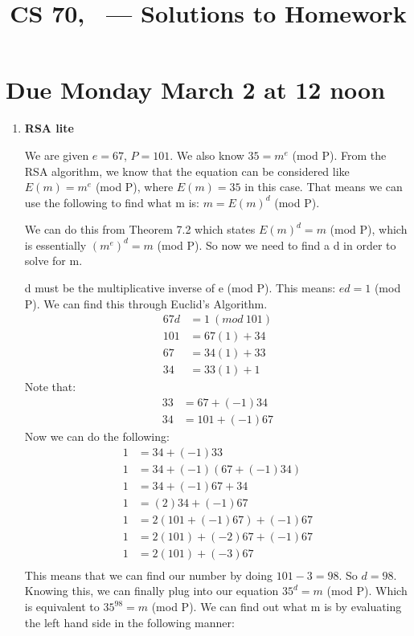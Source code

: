 \documentclass[12pt,fleqn]{article}
\title{CS 70, \Session\ --- Solutions to Homework \Homework}
\date{}
\begin{document}
\maketitle

\section*{Due Monday March 2 at 12 noon}



\begin{enumerate}
  
  \item \textbf{RSA lite} 
  
  We are given $e = 67$, $P = 101$. We also know $35 = m^{e}$ (mod P). 
  From the RSA algorithm, we know that the equation can be considered like $E(m) = m^{e}$ (mod P), where $E(m) = 35$ in this case. That means we can use the following to find what m is: $m = E(m)^{d}$ (mod P). 
  
  We can do this from Theorem 7.2 which states $E(m)^{d} = m$ (mod P), which is essentially $(m^{e})^{d} = m$ (mod P). So now we need to find a d in order to solve for m. 
  
  d must be the multiplicative inverse of e (mod P). This means: $ed = 1$ (mod P). We can find this through Euclid's Algorithm. 
  \begin{align*} 
	67d &= 1 \:(mod\: 101) \\
	101 &= 67(1) + 34 \\
	67 &= 34(1) + 33 \\
	34 &= 33(1) + 1 
  \end{align*}
  Note that: 
  \begin{align*} 
	33 &= 67 + (-1)34 \\
	34 &= 101 + (-1)67 
  \end{align*} 
  Now we can do the following:
  \begin{align*} 
	1 &= 34 + (-1)33 \\
	1 &= 34 + (-1)(67 + (-1)34)\\
	1 &= 34 + (-1)67 + 34\\
	1 &= (2)34 + (-1)67\\
	1 &= 2(101 + (-1)67) + (-1)67\\
	1 &= 2(101) + (-2)67 + (-1)67 \\
	1 &= 2(101) + (-3)67\\
  \end{align*} 
  This means that we can find our number by doing $101 - 3 = 98$. So $d = 98$. Knowing this, we can finally plug into our equation $35^d = m$ (mod P). Which is equivalent to $35^{98} = m$ (mod P). We can find out what m is by evaluating the left hand side in the following manner:
  

\end{enumerate}
\end{document}
